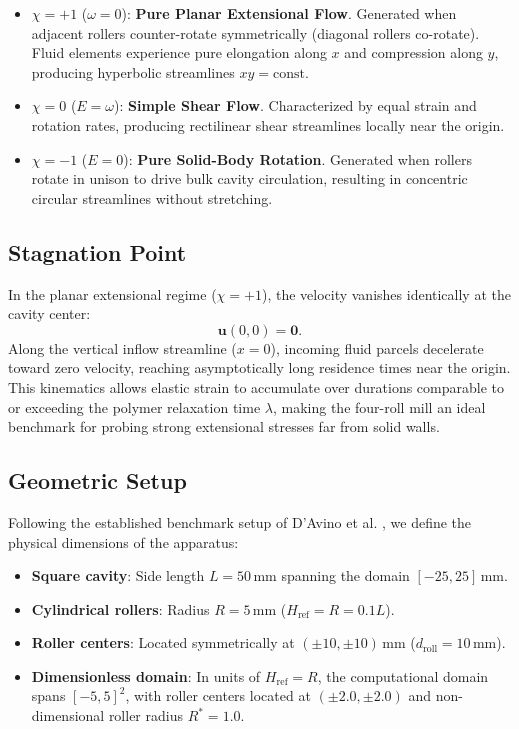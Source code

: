 \begin{itemize}[noitemsep, topsep=3pt, parsep=1pt]
    \item $\chi = +1$ ($\omega = 0$): \textbf{Pure Planar Extensional Flow}.
    Generated when adjacent rollers counter-rotate symmetrically (diagonal rollers co-rotate).
    Fluid elements experience pure elongation along $x$ and compression along $y$, producing hyperbolic streamlines $x y = \text{const}$.
    \item $\chi = 0$ ($E = \omega$): \textbf{Simple Shear Flow}.
    Characterized by equal strain and rotation rates, producing rectilinear shear streamlines locally near the origin.
    \item $\chi = -1$ ($E = 0$): \textbf{Pure Solid-Body Rotation}.
    Generated when rollers rotate in unison to drive bulk cavity circulation, resulting in concentric circular streamlines without stretching.
\end{itemize}

\subsection{Stagnation Point}
\label{subsec:stagnation_point}
In the planar extensional regime ($\chi = +1$), the velocity vanishes identically at the cavity center:
\begin{equation}
    \boldsymbol{u}(0, 0) = \boldsymbol{0} .
\end{equation}
Along the vertical inflow streamline ($x = 0$), incoming fluid parcels decelerate toward zero velocity,
reaching asymptotically long residence times near the origin.
This kinematics allows elastic strain to accumulate over durations comparable to
or exceeding the polymer relaxation time $\lambda$, making the four-roll mill
an ideal benchmark for probing strong extensional stresses far from solid walls.

\subsection{Geometric Setup}
\label{subsec:geometry_setup}

Following the established benchmark setup of D'Avino et al.
\cite{davino2017numerical}, we define the physical dimensions of the apparatus:
\begin{itemize}[noitemsep, topsep=3pt, parsep=1pt]
    \item \textbf{Square cavity}: Side length $L = 50\,\mathrm{mm}$ spanning the
        domain $[-25, 25]\,\mathrm{mm}$.
    \item \textbf{Cylindrical rollers}: Radius $R = 5\,\mathrm{mm}$
        ($H_{\mathrm{ref}} = R = 0.1 L$).
    \item \textbf{Roller centers}: Located symmetrically at $(\pm 10, \pm
        10)\,\mathrm{mm}$ ($d_{\mathrm{roll}} = 10\,\mathrm{mm}$).
    \item \textbf{Dimensionless domain}: In units of $H_{\mathrm{ref}} = R$, the
        computational domain spans $[-5, 5]^2$, with roller centers located at
        $(\pm 2.0, \pm 2.0)$ and non-dimensional roller radius $R^* = 1.0$.
\end{itemize}

